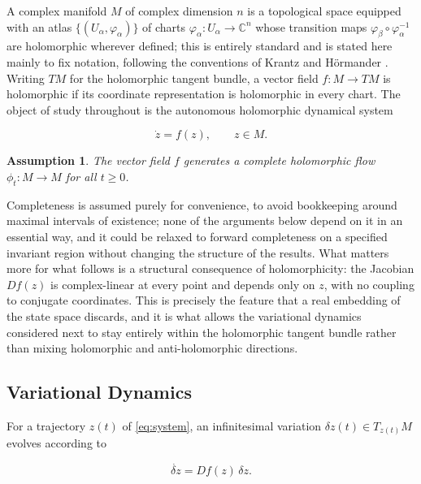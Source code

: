 \documentclass[preprint,12pt,authoryear]{elsarticle}
\newtheorem{assumption}{Assumption}
\begin{document}
A complex manifold $M$ of complex dimension $n$ is a topological space equipped with an atlas $\{(U_\alpha,\varphi_\alpha)\}$ of charts $\varphi_\alpha:U_\alpha\to\mathbb{C}^n$ whose transition maps $\varphi_\beta\circ\varphi_\alpha^{-1}$ are holomorphic wherever defined; this is entirely standard and is stated here mainly to fix notation, following the conventions of Krantz \cite{krantz2001function} and H\"ormander \cite{hormander1973introduction}. Writing $TM$ for the holomorphic tangent bundle, a vector field $f:M\to TM$ is holomorphic if its coordinate representation is holomorphic in every chart. The object of study throughout is the autonomous holomorphic dynamical system

\begin{equation}
\dot z = f(z), \qquad z\in M. \label{eq:system}
\end{equation}

\begin{assumption}
\label{ass:complete}
The vector field $f$ generates a complete holomorphic flow $\phi_t:M\to M$ for all $t\ge0$.
\end{assumption}

Completeness is assumed purely for convenience, to avoid bookkeeping around maximal intervals of existence; none of the arguments below depend on it in an essential way, and it could be relaxed to forward completeness on a specified invariant region without changing the structure of the results. What matters more for what follows is a structural consequence of holomorphicity: the Jacobian $Df(z)$ is complex-linear at every point and depends only on $z$, with no coupling to conjugate coordinates. This is precisely the feature that a real embedding of the state space discards, and it is what allows the variational dynamics considered next to stay entirely within the holomorphic tangent bundle rather than mixing holomorphic and anti-holomorphic directions.

\subsection{Variational Dynamics}

For a trajectory $z(t)$ of \eqref{eq:system}, an infinitesimal variation $\delta z(t)\in T_{z(t)}M$ evolves according to

\begin{equation}
\dot{\delta z} = Df(z)\,\delta z. \label{eq:variational}
\end{equation}
\end{document}
